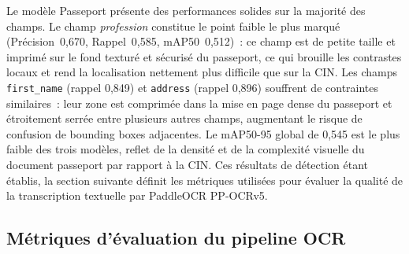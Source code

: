 \noindent Le modèle Passeport présente des performances solides sur la majorité des champs. Le champ \textit{profession} constitue le point faible le plus marqué (Précision~0,670, Rappel~0,585, mAP50~0,512)~: ce champ est de petite taille et imprimé sur le fond texturé et sécurisé du passeport, ce qui brouille les contrastes locaux et rend la localisation nettement plus difficile que sur la CIN. Les champs \texttt{first\_name} (rappel 0,849) et \texttt{address} (rappel 0,896) souffrent de contraintes similaires~: leur zone est comprimée dans la mise en page dense du passeport et étroitement serrée entre plusieurs autres champs, augmentant le risque de confusion de bounding boxes adjacentes. Le mAP50-95 global de 0,545 est le plus faible des trois modèles, reflet de la densité et de la complexité visuelle du document passeport par rapport à la CIN. Ces résultats de détection étant établis, la section suivante définit les métriques utilisées pour évaluer la qualité de la transcription textuelle par PaddleOCR PP-OCRv5.

\subsection{Métriques d'évaluation du pipeline OCR}
\label{subsec:metriques-ocr}

